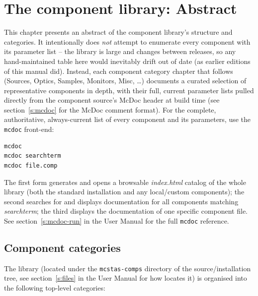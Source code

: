 \chapter{The component library: Abstract}
\label{c:components}

This chapter presents an abstract of the \MCS component library's structure
and categories. It intentionally does \emph{not} attempt to enumerate every
component with its parameter list -- the library is large and changes
between releases, so any hand-maintained table here would inevitably drift
out of date (as earlier editions of this manual did). Instead, each
component category chapter that follows (Sources, Optics, Samples,
Monitors, Misc, \ldots) documents a curated selection of representative
components in depth, with their full, current parameter lists pulled
directly from the component source's McDoc header at build time (see
section~\ref{s:mcdoc} for the McDoc comment format). For the complete,
authoritative, always-current list of every component and its parameters,
use the \verb+mcdoc+ front-end:
\begin{lstlisting}
mcdoc
mcdoc searchterm
mcdoc file.comp
\end{lstlisting}
The first form generates and opens a browsable \textit{index.html} catalog
of the whole library (both the standard installation and any local/custom
components); the second searches for and displays documentation for all
components matching \textit{searchterm}; the third displays the
documentation of one specific component file. See
section~\ref{s:mcdoc-run} in the User Manual for the full \verb+mcdoc+
reference.

\section{Component categories}
\label{s:comp-overview}

The library (located under the \verb+mcstas-comps+ directory of the \MCS
source/installation tree, see section~\ref{s:files} in the User Manual for
how \mcs locates it) is organised into the following top-level categories:

